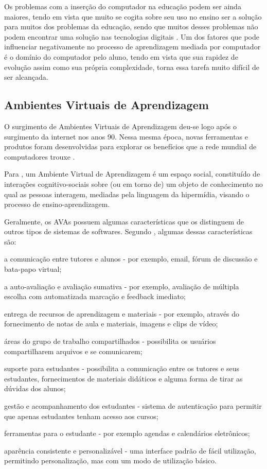 Os problemas com a inserção do computador na educação podem ser ainda maiores, tendo em vista que muito se cogita sobre seu uso no ensino ser a solução para muitos dos problemas da educação, sendo que muitos desses problemas não podem encontrar uma solução nas tecnologias digitais \cite{silva2009ambiente}. Um dos fatores que pode influenciar negativamente no processo de aprendizagem mediada por computador é o domínio do computador pelo aluno, tendo em vista que sua rapidez de evolução assim como sua própria complexidade, torna essa tarefa muito difícil de ser alcançada.

\subsection{Ambientes Virtuais de Aprendizagem}

O surgimento de Ambientes Virtuais de Aprendizagem deu-se logo após o surgimento da internet nos anos 90. Nessa mesma época, novas ferramentas e produtos foram desenvolvidas para explorar os benefícios que a rede mundial de computadores trouxe \cite{oleary2002virtual}.

Para , um Ambiente Virtual de Aprendizagem é um espaço social, constituído de interações cognitivo-sociais sobre (ou em torno de) um objeto de conhecimento no qual as pessoas interagem, mediadas pela linguagem da hipermídia, visando o processo de ensino-aprendizagem.

Geralmente, os AVAs possuem algumas características que os distinguem de outros tipos de sistemas de softwares. Segundo , algumas dessas características são:
\begin{alineascomponto}
    \item a comunicação entre tutores e alunos - por exemplo, email, fórum de discussão e bata-papo virtual;
    \item a auto-avaliação e avaliação sumativa - por exemplo, avaliação de múltipla escolha com automatizada marcação e feedback imediato; 
    \item entrega de recursos de aprendizagem e materiais - por exemplo, através do fornecimento de notas de aula e materiais, imagens e clips de vídeo;
    \item áreas do grupo de trabalho compartilhados - possibilita os usuários compartilharem arquivos e se comunicarem;
    \item suporte para estudantes - possibilita a comunicação entre os tutores e seus estudantes, fornecimentos de materiais didáticos e alguma forma de tirar as dúvidas dos alunos;
    \item gestão e acompanhamento dos estudantes - sistema de autenticação para permitir que apenas estudantes tenham acesso aos cursos;
    \item ferramentas para o estudante - por exemplo agendas e calendários eletrônicos;
    \item aparência consistente e personalizável - uma interface padrão de fácil utilização, permitindo personalização, mas com um modo de utilização básico.
\end{alineascomponto}

